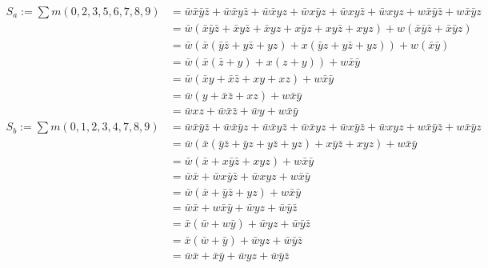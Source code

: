 \documentclass{article}
\begin{document}
    \begin{align*}
        S_a := \sum m(0, 2, 3, 5, 6, 7, 8, 9) &= \bar{w}\bar{x}\bar{y}\bar{z} + \bar{w}\bar{x}y\bar{z} + \bar{w}\bar{x}yz + \bar{w}x\bar{y}z + \bar{w}xy\bar{z} + \bar{w}xyz + w\bar{x}\bar{y}\bar{z} + w\bar{x}\bar{y}z\\
        &= \bar{w}(\bar{x}\bar{y}\bar{z} + \bar{x}y\bar{z} + \bar{x}yz + x\bar{y}z + xy\bar{z} + xyz) + w(\bar{x}\bar{y}\bar{z} + \bar{x}\bar{y}z)\\
        &= \bar{w}(\bar{x}(\bar{y}\bar{z} + y\bar{z} + yz) + x(\bar{y}z + y\bar{z} + yz)) + w(\bar{x}\bar{y})\\
        &= \bar{w}(\bar{x}(\bar{z} + y) + x(z + y)) + w\bar{x}\bar{y}\\
        &= \bar{w}(\bar{x}y + \bar{x}\bar{z} + xy + xz) + w\bar{x}\bar{y}\\ 
        &= \bar{w}(y + \bar{x}\bar{z} + xz) + w\bar{x}\bar{y}\\
        &= \bar{w}xz + \bar{w}\bar{x}\bar{z} +  \bar{w}y + w\bar{x}\bar{y}\\ 
        S_b := \sum m(0, 1, 2, 3, 4, 7, 8, 9) &= \bar{w}\bar{x}\bar{y}\bar{z} + \bar{w}\bar{x}\bar{y}z + \bar{w}\bar{x}y\bar{z} + \bar{w}\bar{x}yz + \bar{w}x\bar{y}\bar{z} + \bar{w}xyz + w\bar{x}\bar{y}\bar{z} + w\bar{x}\bar{y}z\\
        &= \bar{w}(\bar{x}(\bar{y}\bar{z} + \bar{y}z + y\bar{z} + yz) + x\bar{y}\bar{z} + xyz) + w\bar{x}\bar{y} \\
        &= \bar{w}(\bar{x} + x\bar{y}\bar{z} + xyz) + w\bar{x}\bar{y} \\
        &= \bar{w}\bar{x} + \bar{w}x\bar{y}\bar{z} + \bar{w}xyz + w\bar{x}\bar{y}\\
        &= \bar{w}(\bar{x} + \bar{y}\bar{z} + yz) + w\bar{x}\bar{y}\\
        &= \bar{w}\bar{x} + w\bar{x}\bar{y}+ \bar{w}yz + \bar{w}\bar{y}\bar{z} \\
        &= \bar{x}(\bar{w} + w\bar{y}) + \bar{w}yz + \bar{w}\bar{y}\bar{z}\\
        &= \bar{x}(\bar{w} + \bar{y}) + \bar{w}yz + \bar{w}\bar{y}\bar{z}\\
        &= \bar{w}\bar{x} + \bar{x}\bar{y} + \bar{w}yz + \bar{w}\bar{y}\bar{z}
    \end{align*}

    \newpage
\end{document}
